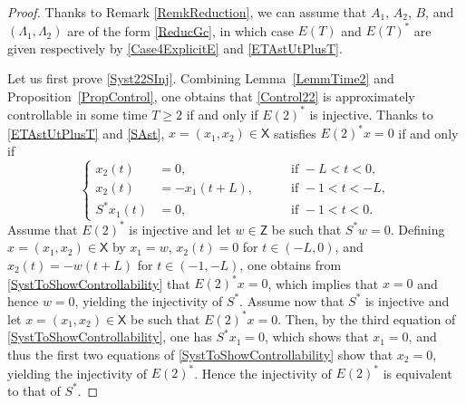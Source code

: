 \documentclass[10pt]{amsart}
\theoremstyle{plain}
\theoremstyle{definition}
\begin{document}
\begin{proof}
Thanks to Remark \ref{RemkReduction}, we can assume that $A_1$, $A_2$, $B$, and $(\Lambda_1, \Lambda_2)$ are of the form \eqref{ReducGc}, in which case $E(T)$ and $E(T)^\ast$ are given respectively by \eqref{Case4ExplicitE} and \eqref{ETAstUtPlusT}.

Let us first prove \eqref{Syst22SInj}. Combining Lemma~\ref{LemmTime2} and Proposition~\ref{PropControl}, one obtains that \eqref{Control22} is approximately controllable in some time $T \geq 2$ if and only if $E(2)^\ast$ is injective. Thanks to \eqref{ETAstUtPlusT} and \eqref{SAst}, $x = (x_1, x_2) \in \mathsf X$ satisfies $E(2)^\ast x = 0$ if and only if
\begin{equation}
\label{SystToShowControllability}
\left\{
\begin{aligned}
x_2(t) & = 0, & \quad & \text{ if } -L < t < 0, \\
x_2(t) & = -x_1(t + L) , & & \text{ if } -1 < t < -L, \\
S^\ast x_1(t) & = 0, & & \text{ if } -1 < t < 0.
\end{aligned}
\right.
\end{equation}
Assume that $E(2)^\ast$ is injective and let $w \in \mathsf Z$ be such that $S^\ast w = 0$. Defining $x = (x_1, x_2) \in \mathsf X$ by $x_1 = w$, $x_2(t) = 0$ for $t \in (-L, 0)$, and $x_2(t) = -w(t + L)$ for $t \in (-1, -L)$, one obtains from \eqref{SystToShowControllability} that $E(2)^\ast x = 0$, which implies that $x = 0$ and hence $w = 0$, yielding the injectivity of $S^\ast$. Assume now that $S^\ast$ is injective and let $x = (x_1, x_2) \in \mathsf X$ be such that $E(2)^\ast x = 0$. Then, by the third equation of \eqref{SystToShowControllability}, one has $S^\ast x_1 = 0$, which shows that $x_1 = 0$, and thus the first two equations of \eqref{SystToShowControllability} show that $x_2 = 0$, yielding the injectivity of $E(2)^\ast$. Hence the injectivity of $E(2)^\ast$ is equivalent to that of $S^\ast$.


\end{proof}
\end{document}
